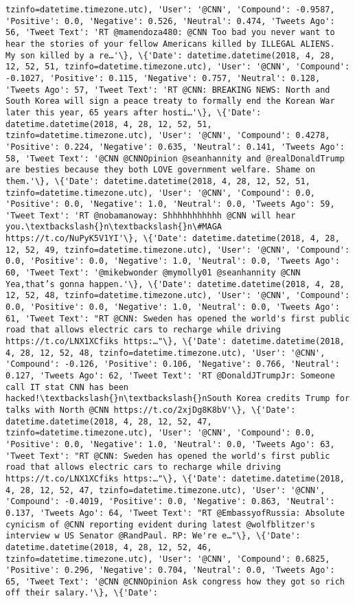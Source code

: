 \documentclass[11pt]{article}
\begin{document}
\begin{Verbatim}[commandchars=\\\{\}]
tzinfo=datetime.timezone.utc), 'User': '@CNN', 'Compound': -0.9587, 'Positive': 0.0, 'Negative': 0.526, 'Neutral': 0.474, 'Tweets Ago': 56, 'Tweet Text': 'RT @mamendoza480: @CNN Too bad you never want to hear the stories of your fellow Americans killed by ILLEGAL ALIENS.  My son killed by a re…'\}, \{'Date': datetime.datetime(2018, 4, 28, 12, 52, 51, tzinfo=datetime.timezone.utc), 'User': '@CNN', 'Compound': -0.1027, 'Positive': 0.115, 'Negative': 0.757, 'Neutral': 0.128, 'Tweets Ago': 57, 'Tweet Text': 'RT @CNN: BREAKING NEWS: North and South Korea will sign a peace treaty to formally end the Korean War later this year, 65 years after hosti…'\}, \{'Date': datetime.datetime(2018, 4, 28, 12, 52, 51, tzinfo=datetime.timezone.utc), 'User': '@CNN', 'Compound': 0.4278, 'Positive': 0.224, 'Negative': 0.635, 'Neutral': 0.141, 'Tweets Ago': 58, 'Tweet Text': '@CNN @CNNOpinion @seanhannity and @realDonaldTrump are besties because they both LOVE government welfare. Shame on them.'\}, \{'Date': datetime.datetime(2018, 4, 28, 12, 52, 51, tzinfo=datetime.timezone.utc), 'User': '@CNN', 'Compound': 0.0, 'Positive': 0.0, 'Negative': 1.0, 'Neutral': 0.0, 'Tweets Ago': 59, 'Tweet Text': 'RT @nobamanoway: Shhhhhhhhhhh @CNN will hear you.\textbackslash{}n\textbackslash{}n\#MAGA https://t.co/NuPyK5V1YI'\}, \{'Date': datetime.datetime(2018, 4, 28, 12, 52, 49, tzinfo=datetime.timezone.utc), 'User': '@CNN', 'Compound': 0.0, 'Positive': 0.0, 'Negative': 1.0, 'Neutral': 0.0, 'Tweets Ago': 60, 'Tweet Text': '@mikebwonder @mymolly01 @seanhannity @CNN Yea,that’s gonna happen.'\}, \{'Date': datetime.datetime(2018, 4, 28, 12, 52, 48, tzinfo=datetime.timezone.utc), 'User': '@CNN', 'Compound': 0.0, 'Positive': 0.0, 'Negative': 1.0, 'Neutral': 0.0, 'Tweets Ago': 61, 'Tweet Text': "RT @CNN: Sweden has opened the world's first public road that allows electric cars to recharge while driving https://t.co/LNX1XCfiks https:…"\}, \{'Date': datetime.datetime(2018, 4, 28, 12, 52, 48, tzinfo=datetime.timezone.utc), 'User': '@CNN', 'Compound': -0.126, 'Positive': 0.106, 'Negative': 0.766, 'Neutral': 0.127, 'Tweets Ago': 62, 'Tweet Text': 'RT @DonaldJTrumpJr: Someone call IT stat CNN has been hacked!\textbackslash{}n\textbackslash{}nSouth Korea credits Trump for talks with North @CNN https://t.co/2xjDg8K8bV'\}, \{'Date': datetime.datetime(2018, 4, 28, 12, 52, 47, tzinfo=datetime.timezone.utc), 'User': '@CNN', 'Compound': 0.0, 'Positive': 0.0, 'Negative': 1.0, 'Neutral': 0.0, 'Tweets Ago': 63, 'Tweet Text': "RT @CNN: Sweden has opened the world's first public road that allows electric cars to recharge while driving https://t.co/LNX1XCfiks https:…"\}, \{'Date': datetime.datetime(2018, 4, 28, 12, 52, 47, tzinfo=datetime.timezone.utc), 'User': '@CNN', 'Compound': -0.4019, 'Positive': 0.0, 'Negative': 0.863, 'Neutral': 0.137, 'Tweets Ago': 64, 'Tweet Text': "RT @EmbassyofRussia: Absolute cynicism of @CNN reporting evident during latest @wolfblitzer's interview w US Senator @RandPaul. RP: We're e…"\}, \{'Date': datetime.datetime(2018, 4, 28, 12, 52, 46, tzinfo=datetime.timezone.utc), 'User': '@CNN', 'Compound': 0.6825, 'Positive': 0.296, 'Negative': 0.704, 'Neutral': 0.0, 'Tweets Ago': 65, 'Tweet Text': '@CNN @CNNOpinion Ask congress how they got so rich off their salary.'\}, \{'Date': 
\end{Verbatim}
\end{document}

